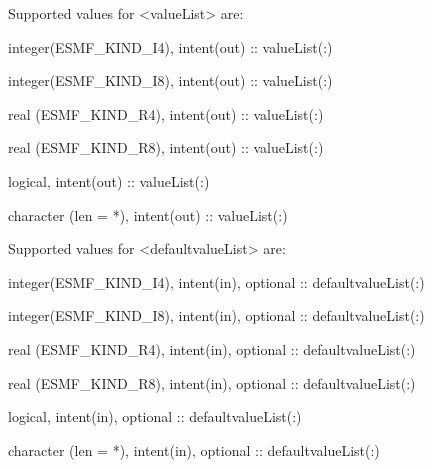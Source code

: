    Supported values for <valueList> are:
   \begin{description}
   \item integer(ESMF\_KIND\_I4), intent(out) :: valueList(:)
   \item integer(ESMF\_KIND\_I8), intent(out) :: valueList(:)
   \item real (ESMF\_KIND\_R4), intent(out) :: valueList(:)
   \item real (ESMF\_KIND\_R8), intent(out) :: valueList(:)
   \item logical, intent(out) :: valueList(:)
   \item character (len = *), intent(out) :: valueList(:)
   \end{description}
  
   Supported values for <defaultvalueList> are:
   \begin{description}
   \item integer(ESMF\_KIND\_I4), intent(in), optional :: defaultvalueList(:)
   \item integer(ESMF\_KIND\_I8), intent(in), optional :: defaultvalueList(:)
   \item real (ESMF\_KIND\_R4), intent(in), optional :: defaultvalueList(:)
   \item real (ESMF\_KIND\_R8), intent(in), optional :: defaultvalueList(:)
   \item logical, intent(in), optional :: defaultvalueList(:)
   \item character (len = *), intent(in), optional :: defaultvalueList(:)
   \end{description}
  
